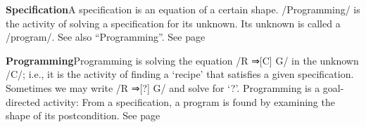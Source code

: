 \documentclass[11pt]{article}
\begin{document}
\vspace{1em}\textbf{Specification}\quad\label{org-special-block-extras-glossary-Specification}A specification is an equation of a certain shape.  \quad /Programming/ is the activity of solving a specification  \quad for its unknown. Its unknown is called a /program/.   \quad See also “Programming”. See page \pageref{org-special-block-extras-glossary-declaration-site-Specification}

\vspace{1em}\textbf{Programming}\quad\label{org-special-block-extras-glossary-Programming}Programming is solving the equation /R ⇒[C] G/ in the unknown /C/; i.e., it is the  activity of finding a ‘recipe’ that satisfies a given specification. Sometimes  we may write /R ⇒[?] G/ and solve for ‘?’. Programming is a goal-directed activity: From a specification, a program is found by examining the shape of its postcondition. See page \pageref{org-special-block-extras-glossary-declaration-site-Programming}
\end{document}
